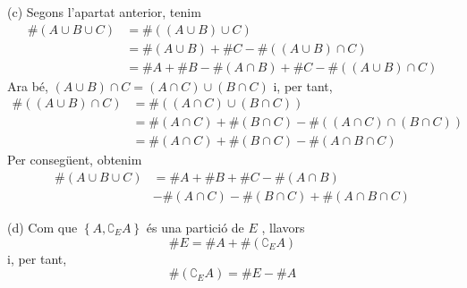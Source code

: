 \begin{solucio}
(c) Segons l'apartat anterior, tenim%
\begin{align*}
\#\left( A\cup B\cup C\right) & =\#\left( (A\cup B)\cup C\right) \\
& =\#(A\cup B)+\#C-\#\left( (A\cup B)\cap C\right) \\
& =\#A+\#B-\#\left( A\cap B\right) +\#C-\#\left( (A\cup B)\cap C\right)
\end{align*}%
Ara bé, $(A\cup B)\cap C=(A\cap C)\cup (B\cap C)$ i, per tant,%
\begin{align*}
\#\left( (A\cup B)\cap C\right) & =\#\left( (A\cap C)\cup (B\cap C)\right) \\
& =\#\left( A\cap C\right) +\#\left( B\cap C\right) -\#\left( (A\cap C)\cap
(B\cap C)\right) \\
& =\#\left( A\cap C\right) +\#\left( B\cap C\right) -\#\left( A\cap B\cap
C\right)
\end{align*}%
Per consegüent, obtenim%
\begin{align*}
\#\left( A\cup B\cup C\right) & =\#A+\#B+\#C-\#\left( A\cap B\right) \\
& -\#\left( A\cap C\right) -\#\left( B\cap C\right) +\#\left( A\cap B\cap
C\right)
\end{align*}

(d) Com que $\left\{ A,\complement _{E}A\right\} $ és una partició
de $E$ , llavors%
\begin{equation*}
\#E=\#A+\#\left( \complement _{E}A\right)
\end{equation*}%
i, per tant,
\begin{equation*}
\#\left( \complement _{E}A\right) =\#E-\#A
\end{equation*}


\end{solucio}
